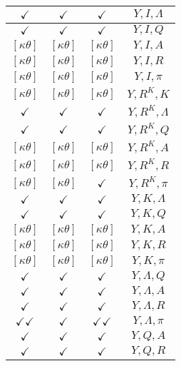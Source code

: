 \documentclass[a4paper,10pt]{article}
\begin{document}
\begin{longtable}{|c|c|c|c|}
\hline
$\checkmark$ & $\checkmark$ & $\checkmark$ & ${Y},{I},{\Lambda}$ \\
\hline
$\checkmark$ & $\checkmark$ & $\checkmark$ & ${Y},{I},{Q}$ \\
\hline
$[\kappa \theta ]$ & $[\kappa \theta ]$ & $[\kappa \theta ]$ & ${Y},{I},{A}$ \\
\hline
$[\kappa \theta ]$ & $[\kappa \theta ]$ & $[\kappa \theta ]$ & ${Y},{I},{R}$ \\
\hline
$[\kappa \theta ]$ & $[\kappa \theta ]$ & $[\kappa \theta ]$ & ${Y},{I},{\pi}$ \\
\hline
$[\kappa \theta ]$ & $[\kappa \theta ]$ & $[\kappa \theta ]$ & ${Y},{R^{K}},{K}$ \\
\hline
$\checkmark$ & $\checkmark$ & $\checkmark$ & ${Y},{R^{K}},{\Lambda}$ \\
\hline
$\checkmark$ & $\checkmark$ & $\checkmark$ & ${Y},{R^{K}},{Q}$ \\
\hline
$[\kappa \theta ]$ & $[\kappa \theta ]$ & $[\kappa \theta ]$ & ${Y},{R^{K}},{A}$ \\
\hline
$[\kappa \theta ]$ & $[\kappa \theta ]$ & $[\kappa \theta ]$ & ${Y},{R^{K}},{R}$ \\
\hline
$[\kappa \theta ]$ & $[\kappa \theta ]$ & $\checkmark$ & ${Y},{R^{K}},{\pi}$ \\
\hline
$\checkmark$ & $\checkmark$ & $\checkmark$ & ${Y},{K},{\Lambda}$ \\
\hline
$\checkmark$ & $\checkmark$ & $\checkmark$ & ${Y},{K},{Q}$ \\
\hline
$[\kappa \theta ]$ & $[\kappa \theta ]$ & $[\kappa \theta ]$ & ${Y},{K},{A}$ \\
\hline
$[\kappa \theta ]$ & $[\kappa \theta ]$ & $[\kappa \theta ]$ & ${Y},{K},{R}$ \\
\hline
$[\kappa \theta ]$ & $[\kappa \theta ]$ & $[\kappa \theta ]$ & ${Y},{K},{\pi}$ \\
\hline
$\checkmark$ & $\checkmark$ & $\checkmark$ & ${Y},{\Lambda},{Q}$ \\
\hline
$\checkmark$ & $\checkmark$ & $\checkmark$ & ${Y},{\Lambda},{A}$ \\
\hline
$\checkmark$ & $\checkmark$ & $\checkmark$ & ${Y},{\Lambda},{R}$ \\
\hline
$\checkmark\checkmark$ & $\checkmark$ & $\checkmark\checkmark$ & ${Y},{\Lambda},{\pi}$ \\
\hline
$\checkmark$ & $\checkmark$ & $\checkmark$ & ${Y},{Q},{A}$ \\
\hline
$\checkmark$ & $\checkmark$ & $\checkmark$ & ${Y},{Q},{R}$ \\

\end{longtable}
\end{document}
